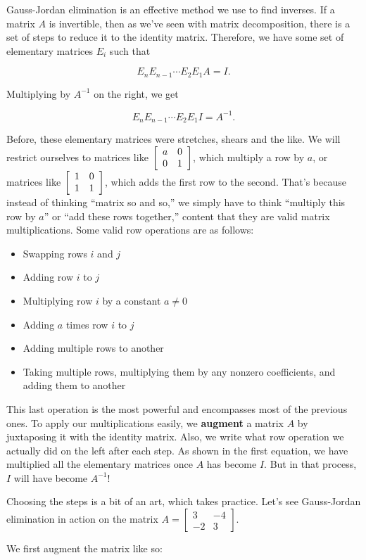 \documentclass[../gatm.tex]{subfiles}
\begin{document}
Gauss-Jordan elimination is an effective method we use to find inverses. If a matrix $A$ is invertible, then as we've seen with matrix decomposition, there is a set of steps to reduce it to the identity matrix. Therefore, we have some set of elementary matrices $E_i$ such that

$$E_nE_{n-1}\cdots E_2E_1A=I.$$

Multiplying by $A^{-1}$ on the right, we get

$$E_nE_{n-1}\cdots E_2E_1I=A^{-1}.$$

Before, these elementary matrices were stretches, shears and the like. We will restrict ourselves to matrices like $\left[\begin{array}{cc} a & 0 \\ 0 & 1 \end{array}\right]$, which multiply a row by $a$, or matrices like $\left[\begin{array}{cc} 1 & 0 \\ 1 & 1 \end{array}\right]$, which adds the first row to the second. That's because instead of thinking ``matrix so and so,'' we simply have to think ``multiply this row by $a$'' or ``add these rows together,'' content that they are valid matrix multiplications. Some valid row operations are as follows:

\begin{itemize}
\item Swapping rows $i$ and $j$
\item Adding row $i$ to $j$
\item Multiplying row $i$ by a constant $a\neq 0$
\item Adding $a$ times row $i$ to $j$
\item Adding multiple rows to another
\item Taking multiple rows, multiplying them by any nonzero coefficients, and adding them to another
\end{itemize}

This last operation is the most powerful and encompasses most of the previous ones. To apply our multiplications easily, we \textbf{augment} a matrix $A$ by juxtaposing it with the identity matrix. Also, we write what row operation we actually did on the left after each step. As shown in the first equation, we have multiplied all the elementary matrices once $A$ has become $I$. But in that process, $I$ will have become $A^{-1}$!

Choosing the steps is a bit of an art, which takes practice. Let's see Gauss-Jordan elimination in action on the matrix $A=\left[\begin{smallmatrix}3 & -4 \\ -2 & 3\end{smallmatrix}\right]$.

We first augment the matrix like so:
\end{document}
